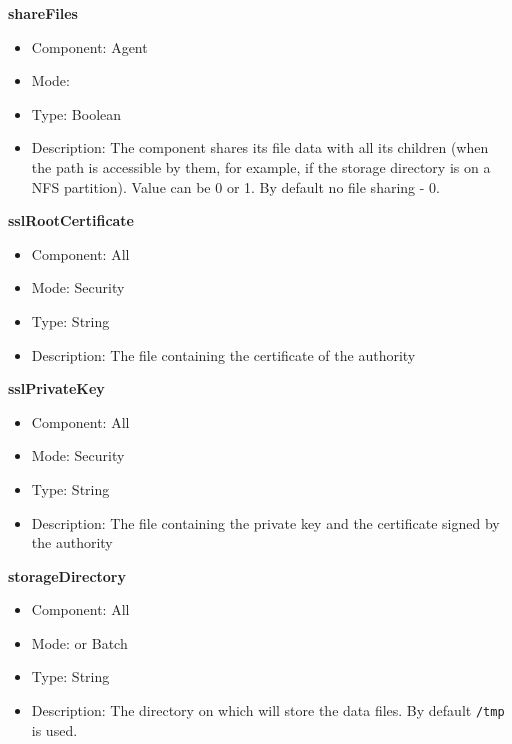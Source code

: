 \begin{description}
\item{\bf{shareFiles}}
  \begin{itemize}
  \item Component: Agent
  \item Mode: \dagda
  \item Type: Boolean
  \item Description: The \dagda component shares its file data with all its children
(when the path is accessible by them, for example, if the storage directory is
on a NFS partition). Value can be 0 or 1.  By default no file sharing - 0.
  \end{itemize}
  

\item{\bf{sslRootCertificate} \label{appssl}}
  \begin{itemize}
  \item Component: All
  \item Mode: Security
  \item Type: String
  \item Description: The file containing the certificate of the authority
  \end{itemize}
  
\item{\bf{sslPrivateKey}}
  \begin{itemize}
  \item Component: All
  \item Mode: Security
  \item Type: String
  \item Description: The file containing the private key and the certificate signed by the authority
  \end{itemize}
  

\item{\bf{storageDirectory}}
  \begin{itemize}
  \item Component: All
  \item Mode: \dagda or Batch
  \item Type: String
  \item Description: The directory on which \dagda will store the data files.
  By default \texttt{/tmp} is used.
  \end{itemize}



\end{description}
